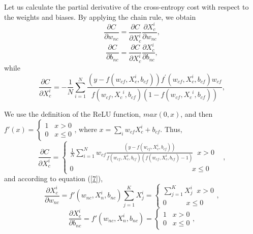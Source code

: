 \documentclass{sig-alternate-05-2015}
\begin{document}

Let us calculate the partial derivative of the cross-entropy cost with respect to the weights and biases. By applying the chain rule, we obtain
\begin{equation}\label{}
\frac{{\partial C}}{{\partial {w_{nc}}}} = \frac{{\partial C}}{{\partial {X_c^i}}}\frac{{\partial {X_c^i}}}{{\partial {w_{nc}}}},
\end{equation}
\begin{equation}\label{}
\frac{{\partial C}}{{\partial {b_{nc}}}} = \frac{{\partial C}}{{\partial X_c^i}}\frac{{\partial X_c^i}}{{\partial {b_{nc}}}},
\end{equation}
while
\begin{equation}\label{}
\frac{{\partial C}}{{\partial {X_c^i}}} =  - \frac{1}{N}\sum\limits_{i = 1}^N {\frac{{(y - f({w_{cf}},{X_c^i},{b_{cf}})){f^{'}}({w_{cf}},{X_c^i},{b_{cf}}){w_{cf}}}}{{f({w_{cf}},{X_c}^i,{b_{cf}})(1 - f({w_{cf}},{X_c}^i,{b_{cf}}))}}},
\end{equation}

We use the definition of the ReLU function, $max(0, x)$, and then $f'(x) = \left\{ \begin{array}{l}
1\;\;\;x > 0\\
0\;\;\;x \le 0
\end{array} \right.$, where $x = \sum\limits_i {{w_{cf}}X_c^i}  + {b_{cf}}$. Thus,
\begin{equation}\label{}
\frac{{\partial C}}{{\partial X_c^i}} = \left\{ \begin{array}{l}
\frac{1}{N}\sum\limits_{i = 1}^N {{w_{cf}}} \frac{{\left( {y - f({w_{cf}},X_c^i,{b_{cf}})} \right)}}{{f({w_{cf}},X_c^i,{b_{cf}})\left( {f({w_{cf}},X_c^i,{b_{cf}}) - 1} \right)}}\;\;x > 0\\
0\;\;\;\;\;\;\;\;\;\;\;\;\;\;\;\;\;\;\;\;\;\;\;\;\;\;\;\;\;\;\;\;\;\;\;\;\;\;\;\;\;\;\;\;\;\;\;\;\;\;\;\;\;\;\;\;\;\;\;\;x \le 0
\end{array} \right.\;\;\;,
\end{equation}
and according to equation (\ref{7}),
\begin{equation}\label{}
\frac{{\partial X_c^i}}{{\partial {w_{nc}}}} = f'({w_{nc}},X_n^i,{b_{nc}})\sum\limits_{j = 1}^K {X_j^i}  = \left\{ \begin{array}{l}
\sum\limits_{j = 1}^K {X_j^i} \;\;x > 0\\
0\;\;\;\;\;\;\;\;\;\;x \le 0
\end{array} \right.,
\end{equation}
\begin{equation}\label{}
\frac{{\partial X_c^i}}{{\partial {b_{nc}}}} = f'({w_{nc}},X_n^i,{b_{nc}}) = \left\{ \begin{array}{l}
1\;\;\;x > 0\\
0\;\;\;x \le 0
\end{array} \right.,
\end{equation}
\end{document}
